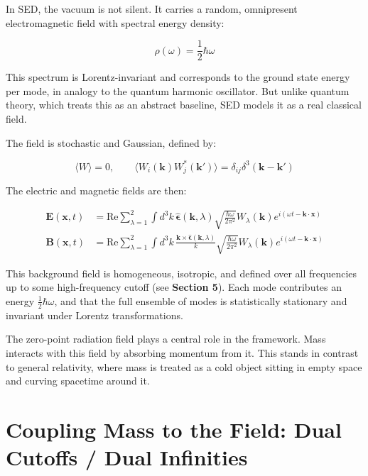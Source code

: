 \documentclass {article}
\renewcommand\vec{\mathbf}
\let\OldHat\hat
\renewcommand{\hat}[1]{\OldHat{\mathbf{#1}}}
\begin{document}
In SED, the vacuum is not silent. It carries a random, omnipresent electromagnetic field with spectral energy density:

\begin{equation}
\rho(\omega) = \frac{1}{2} \hbar \omega
\end{equation}

This spectrum is Lorentz-invariant and corresponds to the ground state energy per mode, in analogy to the quantum harmonic oscillator. But unlike quantum theory, which treats this as an abstract baseline, SED models it as a real classical field.

The field is stochastic and Gaussian, defined by:

\begin{equation}
\langle W \rangle = 0, \qquad 
\langle W_i(\vec{k}) W_j^*(\vec{k}') \rangle = \delta_{ij} \delta^3(\vec{k} - \vec{k}')
\end{equation}

The electric and magnetic fields are then:

\begin{equation}
\begin{aligned}
\vec{E}(\vec{x}, t) &= \text{Re} \sum_{\lambda=1}^2 \int d^3k \, 
\hat{\epsilon}(\vec{k}, \lambda) 
\sqrt{\frac{\hbar \omega}{2\pi^2}} 
W_\lambda(\vec{k}) e^{i(\omega t - \vec{k} \cdot \vec{x})} \\
\vec{B}(\vec{x}, t) &= \text{Re} \sum_{\lambda=1}^2 \int d^3k \, 
\frac{\vec{k} \times \hat{\epsilon}(\vec{k}, \lambda)}{k}
\sqrt{\frac{\hbar \omega}{2\pi^2}} 
W_\lambda(\vec{k}) e^{i(\omega t - \vec{k} \cdot \vec{x})}
\end{aligned}
\end{equation}

This background field is homogeneous, isotropic, and defined over all frequencies up to some high-frequency cutoff (see \textbf{Section 5}). Each mode contributes an energy \( \tfrac{1}{2} \hbar \omega \), and that the full ensemble of modes is statistically stationary and invariant under Lorentz transformations.


The zero-point radiation field plays a central role in the framework. Mass interacts with this field by absorbing momentum from it. This stands in contrast to general relativity, where mass is treated as a cold object sitting in empty space and curving spacetime around it.




\section{Coupling Mass to the Field: Dual Cutoffs / Dual Infinities}
\end{document}

